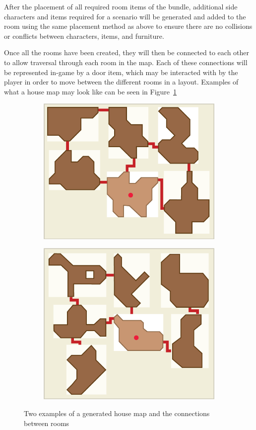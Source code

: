 After the placement of all required room items of the bundle, additional side characters and items required for a scenario will be generated and added to the room using the same placement method as above to ensure there are no collisions or conflicts between characters, items, and furniture.

Once all the rooms have been created, they will then be connected to each other to allow traversal through each room in the map. Each of these connections will be represented in-game by a door item, which may be interacted with by the player in order to move between the different rooms in a layout. Examples of what a house map may look like can be seen in  Figure~\ref{fig:house_map_example}

\begin{figure}[htb]
	\centering
	\begin{subfigure}{.45\textwidth}
		\centering
		\includegraphics[width=.9\linewidth]{images/RoomGeneration_HouseMapExample1}
	\end{subfigure}%
	\begin{subfigure}{.45\textwidth}
		\centering
		\includegraphics[width=.9\linewidth]{images/RoomGeneration_HouseMapExample2}
	\end{subfigure}%
	 \caption{Two examples of a generated house map and the connections between rooms}
	 \label{fig:house_map_example}
\end{figure}

